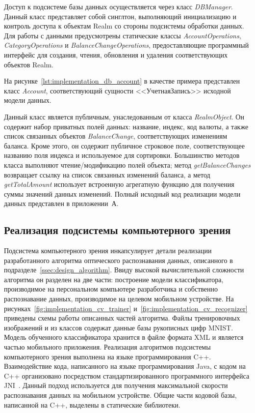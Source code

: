 Доступ к подсистеме базы данных осуществляется через класс
\textit{DBManager}. Данный класс представляет собой синглтон,
выполняющий инициализацию и контроль доступа к объектам Realm
со стороны подсистемы обработки данных.
Для работы с данными предусмотрены статические классы
\textit{AccountOperations}, \textit{CategoryOperations}
и \textit{BalanceChangeOperations}, предоставляющие
программный интерфейс для создания, чтения, обновления и
удаления соответствующих объектов Realm.

На рисунке~\ref{lst:implementation_db_account} в качестве примера
представлен класс \textit{Account}, соответствующий сущности <<УчетнаяЗапись>>
исходной модели данных.



Данный класс является публичным, унаследованным от класса \textit{RealmObject}.
Он содержит набор приватных полей данных: название, индекс, код валюты,
а также список связанных объектов \textit{BalanceChange},
соответствующих изменениям баланса.
Кроме этого, он содержит публичное строковое поле, соответствующее
названию поля индекса и используемое для сортировки.
Большинство методов класса выполняют чтение/модификацию
полей объекта; метод \textit{getBalanceChanges} возвращает ссылку на
список связанных изменений баланса,
а метод \textit{getTotalAmount} использует встроенную
агрегатную функцию для получения суммы значений данных изменений.
Полный исходный код реализации модели данных представлен в приложении~А.

\subsection{Реализация подсистемы компьютерного зрения}
\label{subsec:implementation_cv}

Подсистема компьютерного зрения инкапсулирует детали реализации
разработанного алгоритма оптического распознавания данных,
описанного в подразделе~\ref{ssec:design_algorithm}.
Ввиду высокой вычислительной сложности алгоритма
он разделен на две части:
построение модели классификатора,
производимое на персональном компьютере разработчика и
собственно распознавание данных,
производимое на целевом мобильном устройстве.
На рисунках~\ref{fig:implementation_cv_trainer}
и~\ref{fig:implementation_cv_recognizer} приведены схемы работы
описанных частей алгоритма.
Файлы тренировочных изображений и из классов содержат
данные базы рукописных цифр MNIST.
Модель обученного классификатора хранится в файле формата XML
и является частью мобильного приложения.
Реализация алгоритмов подсистемы компьютерного зрения
выполнена на языке программирования C++.
Взаимодействие кода, написанного на языке программирования Java,
с кодом на C++ организовано посредством стандартизированного
программного интерфейса JNI~\cite{spec_jni}.
Данный подход используется для получения максимальной скорости
распознавания данных на мобильном устройстве.
Общие части кодовой базы, написанной на C++, выделены в статические библиотеки.

